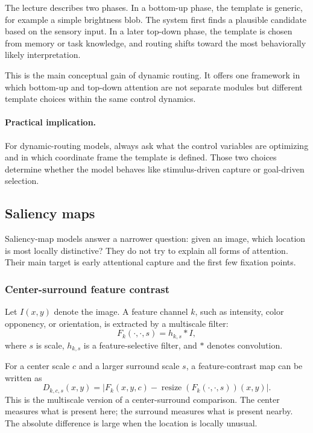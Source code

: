 The lecture describes two phases. In a bottom-up phase, the template is generic, for example a simple brightness blob. The system first finds a plausible candidate based on the sensory input. In a later top-down phase, the template is chosen from memory or task knowledge, and routing shifts toward the most behaviorally likely interpretation.

This is the main conceptual gain of dynamic routing. It offers one framework in which bottom-up and top-down attention are not separate modules but different template choices within the same control dynamics.

\paragraph{Practical implication.}
For dynamic-routing models, always ask what the control variables are optimizing and in which coordinate frame the template is defined. Those two choices determine whether the model behaves like stimulus-driven capture or goal-driven selection.

\subsection{Saliency maps}

Saliency-map models answer a narrower question: given an image, which location is most locally distinctive? They do not try to explain all forms of attention. Their main target is early attentional capture and the first few fixation points.

\subsubsection{Center-surround feature contrast}

Let \(I(x,y)\) denote the image. A feature channel \(k\), such as intensity, color opponency, or orientation, is extracted by a multiscale filter:
\[
F_k(\cdot,\cdot,s) = h_{k,s} * I,
\]
where \(s\) is scale, \(h_{k,s}\) is a feature-selective filter, and \(*\) denotes convolution.

For a center scale \(c\) and a larger surround scale \(s\), a feature-contrast map can be written as
\[
D_{k,c,s}(x,y)
=
\left|
F_k(x,y,c)
-
\operatorname{resize}\!\left(F_k(\cdot,\cdot,s)\right)(x,y)
\right|.
\]
This is the multiscale version of a center-surround comparison. The center measures what is present here; the surround measures what is present nearby. The absolute difference is large when the location is locally unusual.

